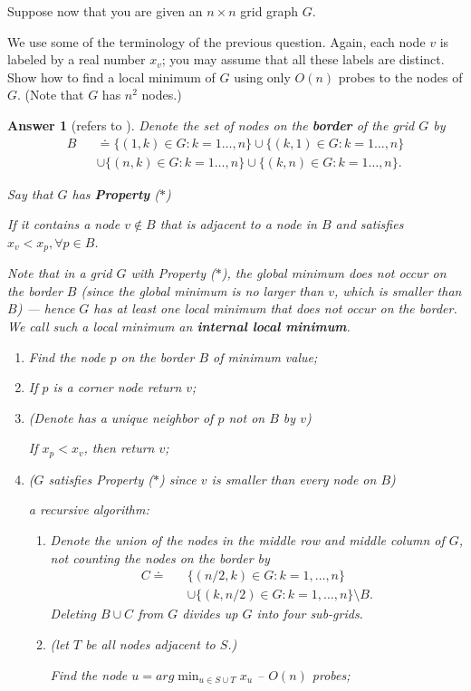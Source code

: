\documentclass[11pt]{article}
\theoremstyle{numberplain}
\theoremstyle{nonumberplain}
\newtheorem{ans}{Answer}
\def\as{{\ast}}
\newcommand{\dps}{\displaystyle}
\newcommand{\0}{{\mathbf{0}}}
\begin{document}
\begin{ques}[HW4,5-7] Suppose now that you are given an $n\times n$ grid graph $G$. \par 
We use some of the terminology of the previous question. Again, each node $v$ is labeled by a real number $x_v$; you may assume that all these labels are distinct. Show how to find a local minimum of $G$ using only $O(n)$ probes to the nodes of $G$. (Note that $G$ has $n^2$ nodes.)
\end{ques}
\begin{ans}[refers to \cite{solcornell}]
Denote the set of nodes on the \textbf{\em border} of the
grid $G$ by 
\begin{eqnarray*}
B&& \doteq \{(1,k)\in G:k=1\ldots,n\} \cup \{(k,1)\in G:k=1\ldots,n\} \\
&& \cup \{(n,k)\in G:k=1\ldots,n\}\cup \{(k,n)\in G:k=1\ldots,n\}.
\end{eqnarray*}

Say that $G$ has \textbf{\em Property} ($\as$) 
\begin{State}
If it contains
a node $v \not\in B$ that is adjacent to a node in $B$ 
and satisfies $x_v < x_p,\forall p\in B$. 
\end{State}
\par 
Note that in a grid $G$ with Property ($\as$), the {\em global minimum}
does not occur on the border $B$ (since the global minimum
is no larger than $v$, which is smaller than $B$) ---
hence $G$ has at least one local minimum that does not occur on the border. We call such a local minimum an \textbf{{\em internal local minimum}}.
\par 	

\begin{code}
\begin{enumerate}
\item Find the node $p$ on the border $B$ of minimum value;
\item If $p$ is a corner node return $v$;
\item (Denote has a unique neighbor of $p$ not on $B$ by $v$)\par 
If $x_p < x_v$, then return $v$;
\item ($G$ satisfies Property ($\as$) since $v$ is smaller than every node on $B$)
\par 
a recursive algorithm:
\begin{enumerate}
\item   Denote the union of the nodes in the middle row and middle column of $G$, not counting the nodes on the border by 
\begin{eqnarray*} 
C \doteq && \{ (n/2,k) \in G:k=1,\ldots, n\}\\
&& \cup \{ (k,n/2)\in G:k=1,\ldots , n \} \setminus B.
\end{eqnarray*}
Deleting $B \cup C$ from $G$ divides up $G$ into four sub-grids.
\item (let $T$ be all nodes adjacent to $S$.)\par 
Find the node $\dps u =arg \min_{u\in S \cup T}x_u$ -- $O(n)$ probes;\par 


\end{enumerate}
\end{enumerate}
\end{code}
\end{ans}
\end{document}
